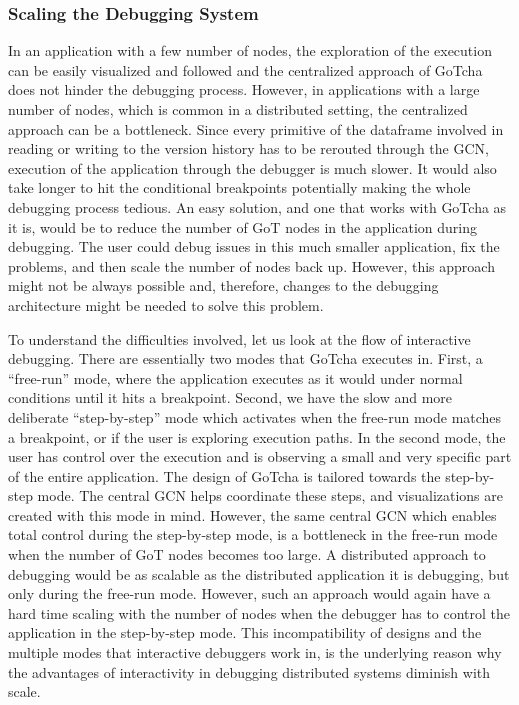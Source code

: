 \subsubsection{Scaling the Debugging System}
In an application with a few number of nodes, the exploration of the execution can be easily visualized and followed and the centralized approach of GoTcha does not hinder the debugging process. However, in applications with a large number of nodes, which is common in a distributed setting, the centralized approach can be a bottleneck. Since every primitive of the dataframe involved in reading or writing to the version history has to be rerouted through the GCN, execution of the application through the debugger is much slower. It would also take longer to hit the conditional breakpoints potentially making the whole debugging process tedious. An easy solution, and one that works with GoTcha as it is, would be to reduce the number of GoT nodes in the application during debugging. The user could debug issues in this much smaller application, fix the problems, and then scale the number of nodes back up. However, this approach might not be always possible and, therefore, changes to the debugging architecture might be needed to solve this problem.

To understand the difficulties involved, let us look at the flow of interactive debugging. There are essentially two modes that GoTcha executes in. First, a ``free-run'' mode, where the application executes as it would under normal conditions until it hits a breakpoint. Second, we have the slow and more deliberate ``step-by-step'' mode which activates when the free-run mode matches a breakpoint, or if the user is exploring execution paths. In the second mode, the user has control over the execution and is observing a small and very specific part of the entire application. The design of GoTcha is tailored towards the step-by-step mode. The central GCN helps coordinate these steps, and visualizations are created with this mode in mind. However, the same central GCN which enables total control during the step-by-step mode, is a bottleneck in the free-run mode when the number of GoT nodes becomes too large. A distributed approach to debugging would be as scalable as the distributed application it is debugging, but only during the free-run mode. However, such an approach would again have a hard time scaling with the number of nodes when the debugger has to control the application in the step-by-step mode. This incompatibility of designs and the multiple modes that interactive debuggers work in, is the underlying reason why the advantages of interactivity in debugging distributed systems diminish with scale.

